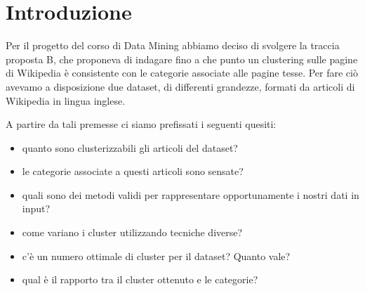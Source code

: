 \documentclass[
	12pt, %
	a4paper, %
	oneside, %
	headinclude,footinclude, %
	BCOR5mm, %
]{scrartcl}
\title{\normalfont\spacedallcaps{Generazione delle categorie di wikipedia attraverso il clustering}} %
\author{\spacedlowsmallcaps{Cazzaro Dalla Cia Lovisotto Vianello}}
\date{} %
\begin{document}

\renewcommand{\sectionmark}[1]{\markright{\spacedlowsmallcaps{#1}}} %
\lehead{\mbox{\llap{\small\thepage\kern1em\color{halfgray} \vline}\color{halfgray}\hspace{0.5em}\rightmark\hfil}} %

\pagestyle{scrheadings} %


\maketitle %

\newpage


\section{Introduzione}

Per il progetto del corso di Data Mining abbiamo deciso di svolgere la traccia proposta B, che proponeva di indagare fino a che punto un clustering sulle pagine di Wikipedia è consistente con le categorie associate alle pagine tesse.
Per fare ciò avevamo a disposizione due dataset, di differenti grandezze, formati da articoli di Wikipedia in lingua inglese.

A partire da tali premesse ci siamo prefissati i seguenti quesiti:

\begin{itemize}
	\item quanto sono clusterizzabili gli articoli del dataset?
	\item le categorie associate a questi articoli sono sensate?
	\item quali sono dei metodi validi per rappresentare opportunamente i nostri dati in input?
	\item come variano i cluster utilizzando tecniche diverse?
	\item c'è un numero ottimale di cluster per il dataset? Quanto vale?
	\item qual è il rapporto tra il cluster ottenuto e le categorie?
\end{itemize}
\end{document}
